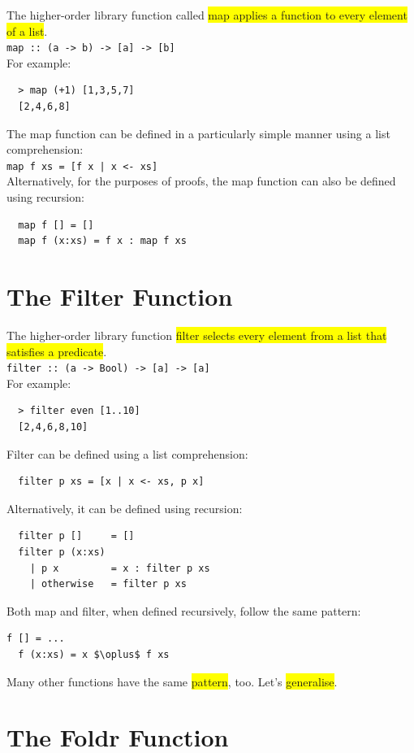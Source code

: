 \documentclass[tikz,border=10pt]{project_plan}
\begin{document}
The higher-order library function called \colorbox{yellow}{map applies a
  function to every element of a list}.\\
\lstinline|map :: (a -> b) -> [a] -> [b]|\\
For example:
\begin{lstlisting}
  > map (+1) [1,3,5,7]
  [2,4,6,8]
\end{lstlisting}

The map function can be defined in a particularly simple
manner using a list comprehension:\\
\lstinline?map f xs = [f x | x <- xs]?\\
Alternatively, for the purposes of proofs, the map function
can also be defined using recursion:
\begin{lstlisting}
  map f [] = []
  map f (x:xs) = f x : map f xs
\end{lstlisting}

\section{The Filter Function}

The higher-order library function \colorbox{yellow}{filter selects every element
  from a list that satisfies a predicate}.\\
\lstinline|filter :: (a -> Bool) -> [a] -> [a]|\\
For example:
\begin{lstlisting}
  > filter even [1..10]
  [2,4,6,8,10]
\end{lstlisting}

Filter can be defined using a list comprehension:
\begin{lstlisting}
  filter p xs = [x | x <- xs, p x]
\end{lstlisting}
Alternatively, it can be defined using recursion:
\begin{lstlisting}
  filter p []     = []
  filter p (x:xs)
    | p x         = x : filter p xs
    | otherwise   = filter p xs
\end{lstlisting}

Both map and filter, when defined recursively,
follow the same pattern:
\begin{lstlisting}[mathescape]
  f [] = ...
  f (x:xs) = x $\oplus$ f xs
\end{lstlisting}
Many other functions have the same \colorbox{yellow}{pattern},
too. Let’s \colorbox{yellow}{generalise}.

\section{The Foldr Function}
\end{document}
